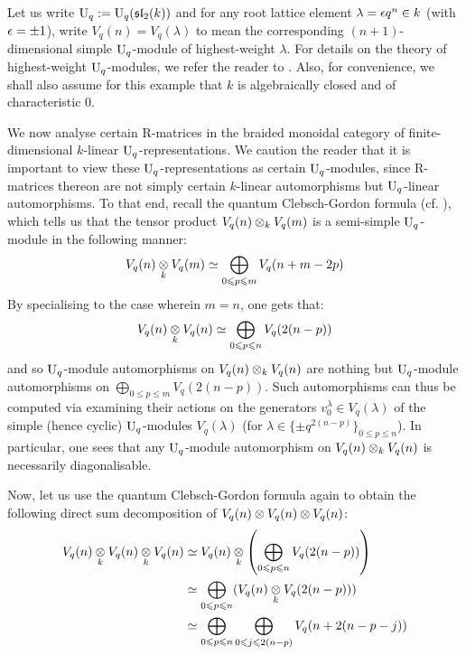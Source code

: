             \begin{example}
                Let us write $\mathrm{U}_q := \mathrm{U}_q(\mathfrak{sl}_2(k))$ and for any root lattice element $\lambda = \epsilon q^n\in k$ (with $\epsilon = \pm 1$), write $V_q(n) = V_q(\lambda)$ to mean the corresponding $(n + 1)$-dimensional simple $\mathrm{U}_q$-module of highest-weight $\lambda$. For details on the theory of highest-weight $\mathrm{U}_q$-modules, we refer the reader to \cite[Chapters VI and VII]{kassel_quantum_groups}. Also, for convenience, we shall also assume for this example that $k$ is algebraically closed and of characteristic $0$. 
                
                We now analyse certain R-matrices in the braided monoidal category of finite-dimensional $k$-linear $\mathrm{U}_q$-representations. We caution the reader that it is important to view these $\mathrm{U}_q$-representations as certain $\mathrm{U}_q$-modules, since R-matrices thereon are not simply certain $k$-linear automorphisms but $\mathrm{U}_q$-linear automorphisms. To that end, recall the quantum Clebsch-Gordon formula (cf. \cite[Theorem VII.7.1]{kassel_quantum_groups}), which tells us that the tensor product $V_q(n) \tensor_k V_q(m)$ is a semi-simple $\mathrm{U}_q$-module in the following manner:
                    $$V_q(n) \tensor_k V_q(m) \cong \bigoplus_{0 \leq p \leq m} V_q(n + m - 2p)$$
                By specialising to the case wherein $m = n$, one gets that:
                    $$V_q(n) \tensor_k V_q(n) \cong \bigoplus_{0 \leq p \leq n} V_q(2(n - p))$$
                and so $\mathrm{U}_q$-module automorphisms on $V_q(n) \tensor_k V_q(n)$ are nothing but $\mathrm{U}_q$-module automorphisms on $\bigoplus_{0 \leq p \leq m} V_q(2(n - p))$. Such automorphisms can thus be computed via examining their actions on the generators $v^{\lambda}_0 \in V_q(\lambda)$ of the simple (hence cyclic) $\mathrm{U}_q$-modules $V_q(\lambda)$ (for $\lambda \in \{\pm q^{ 2(n - p) }\}_{0 \leq p \leq n}$). In particular, one sees that any $\mathrm{U}_q$-module automorphism on $V_q(n) \tensor_k V_q(n)$ is necessarily diagonalisable. 
                
                Now, let us use the quantum Clebsch-Gordon formula again to obtain the following direct sum decomposition of $V_q(n) \tensor V_q(n) \tensor V_q(n)$:
                    $$
                        \begin{aligned}
                            V_q(n) \tensor_k V_q(n) \tensor_k V_q(n) & \cong V_q(n) \tensor_k \left( \bigoplus_{0 \leq p \leq n} V_q(2(n - p)) \right)
                            \\
                            & \cong \bigoplus_{0 \leq p \leq n} ( V_q(n) \tensor_k V_q(2(n - p)) )
                            \\
                            & \cong \bigoplus_{0 \leq p \leq n} \bigoplus_{0 \leq j \leq 2(n - p)} V_q(n + 2(n - p - j))
                        \end{aligned}
                    $$
            \end{example}
            
